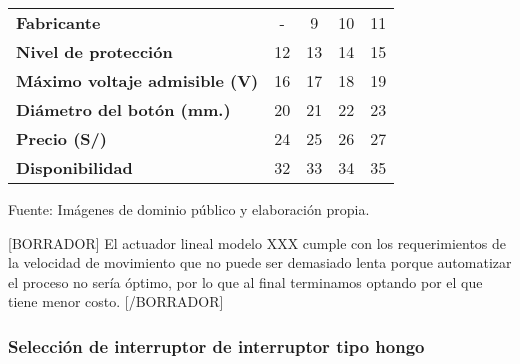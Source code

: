 \begin{mytable}[H]
\begin{tabular}{l|c|c|c|c|}
\begin{minipage}{\mythirdmaxsizeofcontenttable}
		\end{minipage}  \\ \hline
		\multicolumn{1}{|l|}{\textbf{Fabricante}}               & -                                                                     & 9          & 10         & 11         \\ \hline
		\multicolumn{1}{|l|}{\textbf{Nivel de protección}}      & 12                                                                    & 13         & 14         & 15         \\ \hline
		\multicolumn{1}{|l|}{
			\begin{minipage}{\myforthmaxsizeofcontenttable}			
				\textbf{Máximo voltaje admisible (V)}
			\end{minipage}
		}
		&
		16
		& 17         & 18         & 19         \\ \hline
		\multicolumn{1}{|l|}{
			\begin{minipage}{\myforthmaxsizeofcontenttable}			
				\textbf{Diámetro del botón (mm.)}
			\end{minipage}
		} & 20                                                                    & 21         & 22         & 23         \\ \hline
		\multicolumn{1}{|l|}{\textbf{Precio (S/)}}              & 24                                                                    & 25         & 26         & 27         \\ \hline
		\multicolumn{1}{|l|}{\textbf{Disponibilidad}}           & 32                                                                    & 33         & 34         & 35         \\ \hline
	\end{tabular}
	\begin{flushleft}	
		Fuente: Imágenes de dominio público y elaboración propia.
	\end{flushleft}
\end{mytable}

[BORRADOR] El actuador lineal modelo XXX cumple con los requerimientos de la velocidad de movimiento que no puede ser demasiado lenta porque automatizar el proceso no sería óptimo, por lo que al final terminamos optando por el que tiene menor costo. [/BORRADOR]


\subsubsection{Selección de interruptor de interruptor tipo hongo}

